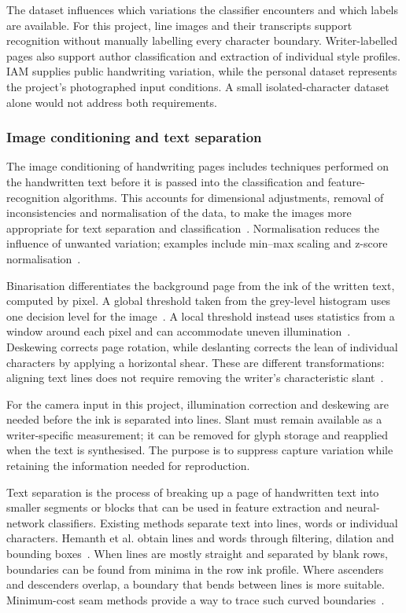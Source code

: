The dataset influences which variations the classifier encounters and which labels are available. For this project, line images and their transcripts support recognition without manually labelling every character boundary. Writer-labelled pages also support author classification and extraction of individual style profiles. IAM supplies public handwriting variation, while the personal dataset represents the project's photographed input conditions. A small isolated-character dataset alone would not address both requirements.

\subsubsection{Image conditioning and text separation}
The image conditioning of handwriting pages includes techniques performed on the handwritten text before it is passed into the classification and feature-recognition algorithms. This accounts for dimensional adjustments, removal of inconsistencies and normalisation of the data, to make the images more appropriate for text separation and classification~\cite[pp.~2458--2460]{hemanth2022}. Normalisation reduces the influence of unwanted variation; examples include min--max scaling and z-score normalisation~\cite[pp.~40--41]{chen2023}.

Binarisation differentiates the background page from the ink of the written text, computed by pixel. A global threshold taken from the grey-level histogram uses one decision level for the image~\cite{otsu1979}. A local threshold instead uses statistics from a window around each pixel and can accommodate uneven illumination~\cite[pp.~2--3]{bradley2007}. Deskewing corrects page rotation, while deslanting corrects the lean of individual characters by applying a horizontal shear. These are different transformations: aligning text lines does not require removing the writer's characteristic slant~\cite{postl1986,vinciarelli2001}.

For the camera input in this project, illumination correction and deskewing are needed before the ink is separated into lines. Slant must remain available as a writer-specific measurement; it can be removed for glyph storage and reapplied when the text is synthesised. The purpose is to suppress capture variation while retaining the information needed for reproduction.

Text separation is the process of breaking up a page of handwritten text into smaller segments or blocks that can be used in feature extraction and neural-network classifiers. Existing methods separate text into lines, words or individual characters. Hemanth et al. obtain lines and words through filtering, dilation and bounding boxes~\cite[pp.~2459--2460]{hemanth2022}. When lines are mostly straight and separated by blank rows, boundaries can be found from minima in the row ink profile. Where ascenders and descenders overlap, a boundary that bends between lines is more suitable. Minimum-cost seam methods provide a way to trace such curved boundaries~\cite[p.~3]{avidan2007}.

